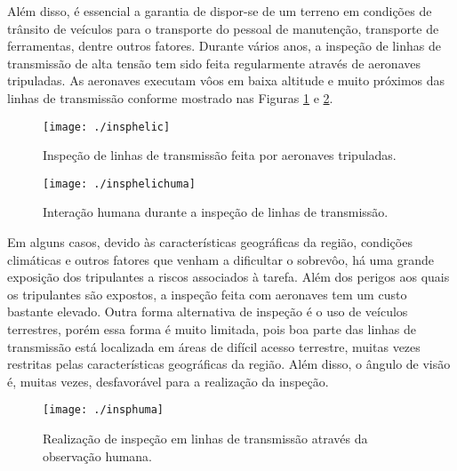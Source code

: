 Além disso, é essencial a garantia de dispor-se de um terreno em condições de trânsito de veículos para o transporte do pessoal de manutenção, transporte de ferramentas, dentre outros fatores. 
Durante vários anos, a inspeção de linhas de transmissão de alta tensão tem sido feita regularmente através de aeronaves tripuladas. As aeronaves executam vôos em baixa altitude e muito próximos das linhas de transmissão conforme mostrado nas  Figuras \ref{img:ihelic} e \ref{img:ihelichuma}.

\begin{figure}[h!]												
	\centering												
	\texttt{[image: ./insphelic]}				
	\caption{Inspeção de linhas de transmissão feita por aeronaves tripuladas.}		
	\label{img:ihelic}												
\end{figure}													
	
\begin{figure} [h!]												 
	\centering													 
	\texttt{[image: ./insphelichuma]}				 
	\caption{Interação humana durante a inspeção de linhas de transmissão.}		
	\label{img:ihelichuma}												 
\end{figure}													 

Em alguns casos, devido às características geográficas da região, condições climáticas e outros fatores que venham a dificultar o sobrevôo, há uma grande exposição dos tripulantes a riscos associados à tarefa. Além dos perigos aos quais os tripulantes são expostos, a inspeção feita com aeronaves tem um custo bastante elevado. Outra forma alternativa de inspeção é o uso de veículos terrestres, porém essa forma é muito limitada, pois boa parte das linhas de transmissão está localizada em áreas de difícil acesso terrestre, muitas vezes restritas pelas características geográficas da região. Além disso, o ângulo de visão é, muitas vezes, desfavorável para a realização da inspeção.

\begin{figure} [h!]												 
	\centering													 
	\texttt{[image: ./insphuma]}				 
	\caption{Realização de inspeção em linhas de transmissão através da observação humana.}		
	\label{img:ihuma}												 
\end{figure}													 

